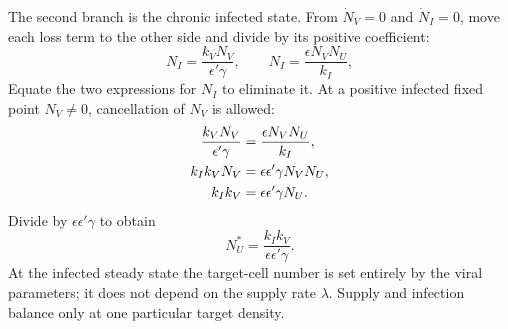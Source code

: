 The second branch is the chronic infected state. From $\dot N_V=0$ and $\dot N_I=0$, move each loss term to the other side and divide by its positive coefficient:
\begin{equation}\label{eq:lec02:fixed-I}
N_I=\frac{k_VN_V}{\epsilon'\gamma},\qquad
N_I=\frac{\epsilon N_VN_U}{k_I},
\end{equation}
Equate the two expressions for $N_I$ to eliminate it. At a positive infected fixed point $N_V\ne0$, cancellation of $N_V$ is allowed:
\begin{align}
\frac{k_VN_V}{\epsilon'\gamma}&=\frac{\epsilon N_VN_U}{k_I},\notag\\
k_Ik_VN_V&=\epsilon\epsilon'\gamma N_VN_U,\notag\\
k_Ik_V&=\epsilon\epsilon'\gamma N_U.\label{eq:lec02:fixed-U-steps}
\end{align}
Divide by $\epsilon\epsilon'\gamma$ to obtain
\begin{equation}\label{eq:lec02:fixed-U}
\boxed{N_U^*=\frac{k_Ik_V}{\epsilon\epsilon'\gamma}.}
\end{equation}
At the infected steady state the target-cell number is set entirely by the viral parameters; it does not depend on the supply rate $\lambda$. Supply and infection balance only at one particular target density.

